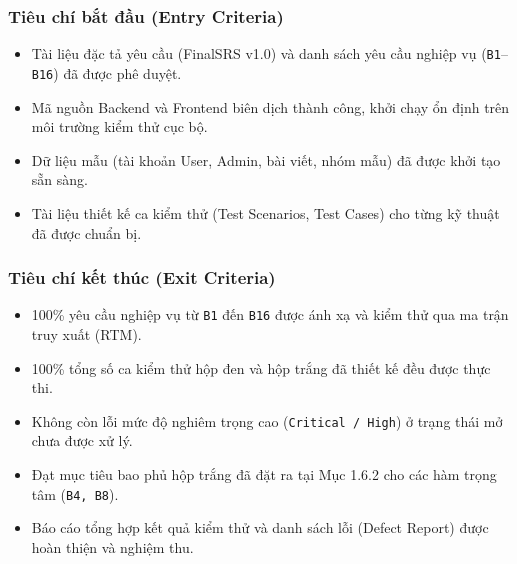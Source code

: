 \documentclass[11pt,a4paper]{article}
\begin{document}
\subsubsection{Tiêu chí bắt đầu (Entry Criteria)}
\begin{itemize}[leftmargin=1.2cm, noitemsep]
    \item[\textbf{--}] Tài liệu đặc tả yêu cầu (FinalSRS v1.0) và danh sách yêu cầu nghiệp vụ (\texttt{B1}--\texttt{B16}) đã được phê duyệt.
    \item[\textbf{--}] Mã nguồn Backend và Frontend biên dịch thành công, khởi chạy ổn định trên môi trường kiểm thử cục bộ.
    \item[\textbf{--}] Dữ liệu mẫu (tài khoản User, Admin, bài viết, nhóm mẫu) đã được khởi tạo sẵn sàng.
    \item[\textbf{--}] Tài liệu thiết kế ca kiểm thử (Test Scenarios, Test Cases) cho từng kỹ thuật đã được chuẩn bị.
\end{itemize}

\subsubsection{Tiêu chí kết thúc (Exit Criteria)}
\begin{itemize}[leftmargin=1.2cm, noitemsep]
    \item[\textbf{--}] 100\% yêu cầu nghiệp vụ từ \texttt{B1} đến \texttt{B16} được ánh xạ và kiểm thử qua ma trận truy xuất (RTM).
    \item[\textbf{--}] 100\% tổng số ca kiểm thử hộp đen và hộp trắng đã thiết kế đều được thực thi.
    \item[\textbf{--}] Không còn lỗi mức độ nghiêm trọng cao (\texttt{Critical / High}) ở trạng thái mở chưa được xử lý.
    \item[\textbf{--}] Đạt mục tiêu bao phủ hộp trắng đã đặt ra tại Mục 1.6.2 cho các hàm trọng tâm (\texttt{B4, B8}).
    \item[\textbf{--}] Báo cáo tổng hợp kết quả kiểm thử và danh sách lỗi (Defect Report) được hoàn thiện và nghiệm thu.
\end{itemize}
\end{document}
